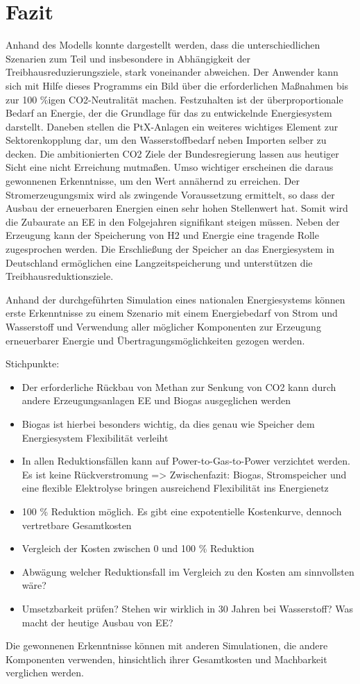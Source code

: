 \section{Fazit}
Anhand des Modells konnte dargestellt werden, dass die unterschiedlichen Szenarien zum Teil und insbesondere in Abhängigkeit der Treibhausreduzierungsziele, stark voneinander abweichen. Der Anwender kann sich mit Hilfe dieses Programms ein Bild über die erforderlichen Maßnahmen bis zur 100 \%igen CO2-Neutralität machen. 
Festzuhalten ist der überproportionale Bedarf an Energie, der die Grundlage für das zu entwickelnde Energiesystem darstellt. Daneben stellen die PtX-Anlagen ein weiteres wichtiges Element zur Sektorenkopplung dar, um den Wasserstoffbedarf neben Importen selber zu decken. 
Die ambitionierten CO2 Ziele der Bundesregierung lassen aus heutiger Sicht eine nicht Erreichung mutmaßen. Umso wichtiger erscheinen die daraus gewonnenen Erkenntnisse, um den Wert annähernd zu erreichen. Der Stromerzeugungsmix wird als zwingende Voraussetzung ermittelt, so dass der Ausbau der erneuerbaren Energien einen sehr hohen Stellenwert hat. Somit wird die Zubaurate an EE in den Folgejahren signifikant steigen müssen. 
Neben der Erzeugung kann der Speicherung von H2 und Energie eine tragende Rolle zugesprochen werden. Die Erschließung der Speicher an das Energiesystem in Deutschland ermöglichen eine Langzeitspeicherung und unterstützen die Treibhausreduktionsziele. 

\newpage
Anhand der durchgeführten Simulation eines nationalen Energiesystems können erste Erkenntnisse zu einem Szenario mit einem Energiebedarf von Strom und Wasserstoff und Verwendung aller möglicher Komponenten zur Erzeugung erneuerbarer Energie und Übertragungsmöglichkeiten gezogen werden.

Stichpunkte:
\begin{itemize}
  \item Der erforderliche Rückbau von Methan zur Senkung von CO2 kann durch andere Erzeugungsanlagen EE und Biogas ausgeglichen werden
  \item Biogas ist hierbei besonders wichtig, da dies genau wie Speicher dem Energiesystem Flexibilität verleiht
  \item In allen Reduktionsfällen kann auf Power-to-Gas-to-Power verzichtet werden. Es ist keine Rückverstromung => Zwischenfazit: Biogas, Stromspeicher und eine flexible Elektrolyse bringen ausreichend Flexibilität ins Energienetz
  \item 100 \% Reduktion möglich. Es gibt eine expotentielle Kostenkurve, dennoch vertretbare Gesamtkosten
  \item Vergleich der Kosten zwischen 0 und 100 \% Reduktion
  \item Abwägung welcher Reduktionsfall im Vergleich zu den Kosten am sinnvollsten wäre?
  \item Umsetzbarkeit prüfen? Stehen wir wirklich in 30 Jahren bei Wasserstoff? Was macht der heutige Ausbau von EE? 
\end{itemize}






Die gewonnenen Erkenntnisse können mit anderen Simulationen, die andere Komponenten verwenden, hinsichtlich ihrer Gesamtkosten und Machbarkeit verglichen werden.